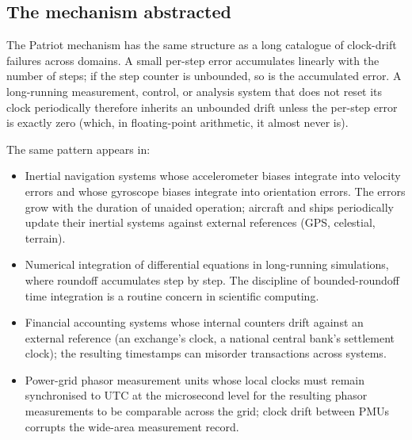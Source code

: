 \subsection{The mechanism abstracted}

The Patriot mechanism has the same structure as a long catalogue of
clock-drift failures across domains. A small per-step error
accumulates linearly with the number of steps; if the step counter
is unbounded, so is the accumulated error. A long-running
measurement, control, or analysis system that does not reset its
clock periodically therefore inherits an unbounded drift unless
the per-step error is exactly zero (which, in floating-point
arithmetic, it almost never is).

The same pattern appears in:
\begin{itemize}[leftmargin=*]
  \item Inertial navigation systems whose accelerometer biases
    integrate into velocity errors and whose gyroscope biases
    integrate into orientation errors. The errors grow with the
    duration of unaided operation; aircraft and ships periodically
    update their inertial systems against external references
    (GPS, celestial, terrain).
  \item Numerical integration of differential equations in
    long-running simulations, where roundoff accumulates step by
    step. The discipline of bounded-roundoff time integration is
    a routine concern in scientific computing.
  \item Financial accounting systems whose internal counters drift
    against an external reference (an exchange's clock, a national
    central bank's settlement clock); the resulting timestamps can
    misorder transactions across systems.
  \item Power-grid phasor measurement units whose local clocks
    must remain synchronised to UTC at the microsecond level for
    the resulting phasor measurements to be comparable across the
    grid; clock drift between PMUs corrupts the wide-area
    measurement record.
\end{itemize}

